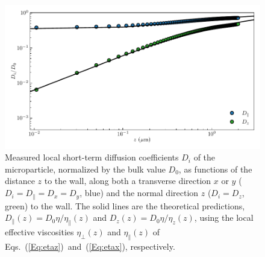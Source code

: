 \begin{figure}[H]
	\centering
	\includegraphics{02_body/chapter3/images/trajctory_analysis/visco.pdf}
	\caption{ Measured local short-term diffusion coefficients $D_i$ of the microparticle, normalized by the bulk value $D_0$, as functions of the distance $z$ to the wall, along both a transverse direction $x$ or $y$ ($D_i=D_\parallel=D_x=D_y$, blue) and the normal direction $z$ ($D_i=D_z$, green) to the wall. The solid lines are the theoretical predictions, $D_{\parallel}(z)=D_0\eta/\eta_{\parallel}(z)$ and $D_z(z)=D_0\eta/\eta_z(z)$, using the local effective viscosities $\eta_{\bot}(z)$ and $\eta_\parallel(z)$ of Eqs.~(\ref{Eq:etaz})~and~(\ref{Eq:etax}), respectively.~\href{https://github.com/eXpensia/Confined-Brownian-Motion/blob/main/02_body/chapter3/images/trajctory_analysis/graph_ploting.ipynb}{\faGithub}}
	\label{fig.visco}
\end{figure}


